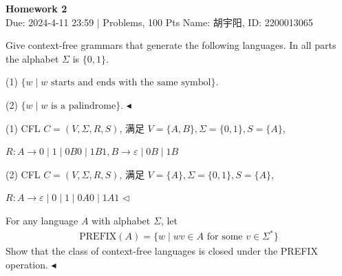 \documentclass[11pt]{article}
\newenvironment{problem}[2][Problem]{\begin{trivlist}
		\item[\hskip \labelsep {\bfseries #1}\hskip \labelsep {\bfseries #2.}]}{\hfill$\blacktriangleleft$\end{trivlist}}
\newenvironment{answer}[1][Answer]{\begin{trivlist}
		\item[\hskip \labelsep {\bfseries #1.}\hskip \labelsep]}{\hfill$\lhd$\end{trivlist}}
\begin{document}
	\pagestyle{fancy}
	\chead{}
	\begin{center}
		{\LARGE \bf Homework 2}\\
		{Due: 2024-4-11 23:59 \quad$|$ Problems, 100 Pts}
		{Name: 胡宇阳, ID: 2200013065}
	\end{center}
	\begin{problem}{1.(12 points)}
		Give context-free grammars that generate the following languages. In all parts the alphabet $\Sigma$ is $\{0, 1\}$.
		
		(1) $\{w \mid w \text{ starts and ends with the same symbol}\}$.
		
		(2) $\{w \mid w \text{ is a palindrome}\}$.
	\end{problem}
	\begin{answer}
		(1) CFL $C=(V,\Sigma,R,S)$, 满足 $V=\{A,B\},\Sigma=\{0,1\},S=\{A\}$,
		
		$R:A\rightarrow 0\mid 1\mid 0B0\mid 1B1,B\rightarrow \varepsilon\mid0B\mid1B$
		
		(2) CFL $C=(V,\Sigma,R,S)$, 满足 $V=\{A\},\Sigma=\{0,1\},S=\{A\}$,
		
		$R:A\rightarrow \varepsilon\mid0\mid 1\mid 0A0\mid 1A1$
	\end{answer}
	\begin{problem}{2.(12 points)}
		For any language $A$ with alphabet $\Sigma$, let 
		\begin{align*}
			\text{PREFIX}(A) = \{w \mid wv \in A \text{ for some } v \in \Sigma^*\}
		\end{align*}
		Show that the class of context-free languages is closed under the PREFIX operation.
	\end{problem}
\end{document}

